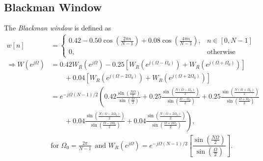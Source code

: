 \documentclass{report}
\begin{document}
\subsection{Blackman Window}
The \emph{Blackman window} is defined as 
\begin{align}
    w[n] &= \begin{cases}
        0.42-0.50\cos\left(\frac{2\pi n}{N-1}\right)+0.08\cos\left(\frac{4\pi n}{N-1}\right), & n\in[0,N-1] \\
        0, & \text{otherwise}
    \end{cases} \\
    \Longrightarrow W(e^{j\Omega}) &= 0.42W_R(e^{j\Omega}) - 0.25[W_R(e^{j(\Omega-\Omega_0)}) +W_R(e^{j(\Omega+\Omega_0)})] \nonumber \\
    &\qquad + 0.04[W_R(e^{j(\Omega-2\Omega_0)}) +W_R(e^{j(\Omega+2\Omega_0)})] \nonumber \\
    &= e^{-j\Omega(N-1)/2} \left(0.42\frac{\sin\left(\frac{N\Omega}{2}\right)}{\sin\left(\frac{\Omega}{2}\right)}+0.25\frac{\sin\left(\frac{N\left(\Omega-\Omega_0\right)}{2}\right)}{\sin\left(\frac{\Omega-\Omega_0}{2}\right)}+0.25\frac{\sin\left(\frac{N\left(\Omega+\Omega_0\right)}{2}\right)}{\sin\left(\frac{\Omega+\Omega_0}{2}\right)}\right. \nonumber \\
    &\qquad +\left. 0.04\frac{\sin\left(\frac{N\left(\Omega-2\Omega_0\right)}{2}\right)}{\sin\left(\frac{\Omega-2\Omega_0}{2}\right)}+0.04\frac{\sin\left(\frac{N\left(\Omega+2\Omega_0\right)}{2}\right)}{\sin\left(\frac{\Omega+2\Omega_0}{2}\right)}\right), \nonumber \\
    &\text{for } \Omega_0 = \frac{2\pi}{N-1}\, \text{ and } W_R(e^{j\Omega}) = e^{-j\Omega(N-1)/2}\left[\dfrac{\sin\left(\frac{N\Omega}{2}\right)}{\sin\left(\frac{\Omega}{2}\right)}\right].
\end{align}
\begin{center}
\end{center}
\end{document}
